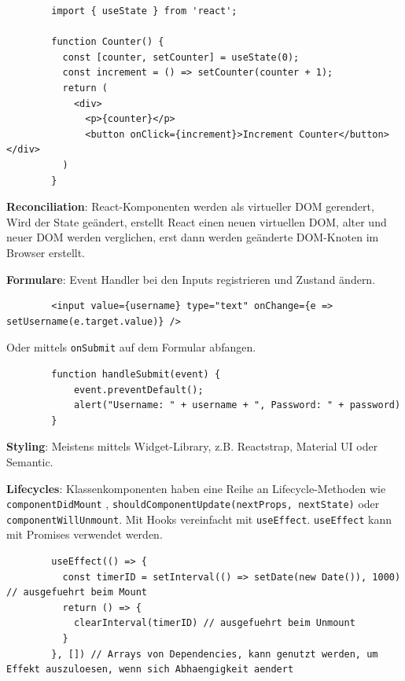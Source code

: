 \documentclass[10pt,landscape]{article}
\begin{document}
\begin{multicols}{2}
        \begin{lstlisting}
        import { useState } from 'react';

        function Counter() {
          const [counter, setCounter] = useState(0);
          const increment = () => setCounter(counter + 1);
          return (
            <div>
              <p>{counter}</p>
              <button onClick={increment}>Increment Counter</button> </div>
          )
        }
        \end{lstlisting}

        \textbf{Reconciliation}: React-Komponenten werden als virtueller DOM gerendert, Wird der State geändert, erstellt React einen neuen virtuellen DOM, alter und neuer DOM werden verglichen, erst dann werden geänderte DOM-Knoten im Browser erstellt.

        \textbf{Formulare}: Event Handler bei den Inputs registrieren und Zustand ändern.

        \begin{lstlisting}
        <input value={username} type="text" onChange={e => setUsername(e.target.value)} />
        \end{lstlisting}

        Oder mittels \lstinline{onSubmit} auf dem Formular abfangen.

        \begin{lstlisting}
        function handleSubmit(event) {
            event.preventDefault();
            alert("Username: " + username + ", Password: " + password)
        }
        \end{lstlisting}

        \textbf{Styling}: Meistens mittels Widget-Library, z.B. Reactstrap, Material UI oder Semantic.

        \textbf{Lifecycles}: Klassenkomponenten haben eine Reihe an Lifecycle-Methoden wie \lstinline{componentDidMount} , \lstinline{shouldComponentUpdate(nextProps, nextState)} oder \lstinline{componentWillUnmount}.
        Mit Hooks vereinfacht mit \lstinline{useEffect}.
        \lstinline{useEffect} kann mit Promises verwendet werden.

        \begin{lstlisting}
        useEffect(() => {
          const timerID = setInterval(() => setDate(new Date()), 1000) // ausgefuehrt beim Mount
          return () => {
            clearInterval(timerID) // ausgefuehrt beim Unmount
          }
        }, []) // Arrays von Dependencies, kann genutzt werden, um Effekt auszuloesen, wenn sich Abhaengigkeit aendert
        \end{lstlisting}


\end{multicols}
\end{document}
